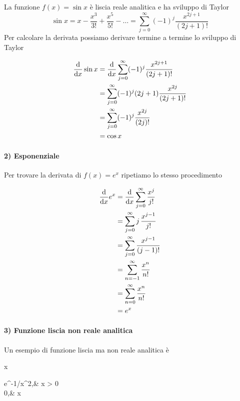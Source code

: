 La funzione $ f (x) = \sin x $ è liscia reale analitica e ha sviluppo di Taylor
%
\begin{equation}
	\sin x = x - \dfrac{x^{3}}{3!} + \dfrac{x^{5}}{5!} - \dots = \sum_{j=0}^{\infty} (-1)^{j} \dfrac{x^{2j+1}}{(2j+1)!}
\end{equation}
Per calcolare la derivata possiamo derivare termine a termine lo sviluppo di Taylor

\begin{align}
	\begin{split}
		\dv{x} \sin x &= \dv{x} \sum_{j=0}^{\infty} (-1)^{j} \dfrac{x^{2j+1}}{(2j+1)!}\\
		&= \sum_{j=0}^{\infty} (-1)^{j} (2j+1) \dfrac{x^{2j}}{(2j+1)!}\\
		&= \sum_{j=0}^{\infty} (-1)^{j} \dfrac{x^{2j}}{(2j)!}\\
		&= \cos x
	\end{split}
\end{align}

\paragraph{2) Esponenziale}

Per trovare la derivata di $ f(x) = e^{x} $ ripetiamo lo stesso procedimento

\begin{align}
	\begin{split}
		\dv{x} e^{x} &= \dv{x} \sum_{j=0}^{\infty}\dfrac{x^{j}}{j!}\\
		&= \sum_{j=0}^{\infty} j \, \dfrac{x^{j-1}}{j!}\\
		&= \sum_{j=0}^{\infty} \dfrac{x^{j-1}}{(j-1)!}\\
		&= \sum_{n=-1}^{\infty} \dfrac{x^{n}}{n!}\\
		&= \sum_{n=0}^{\infty} \dfrac{x^{n}}{n!}\\
		&= e^{x}
	\end{split}
\end{align}

\paragraph{3) Funzione liscia non reale analitica}

Un esempio di funzione liscia ma non reale analitica è

	{\R}{\R}
	{x}{%
		\begin{cases}
			e^{-1/x^{2}},&  x > 0\\
			0,&  x 
		\end{cases}
		}

